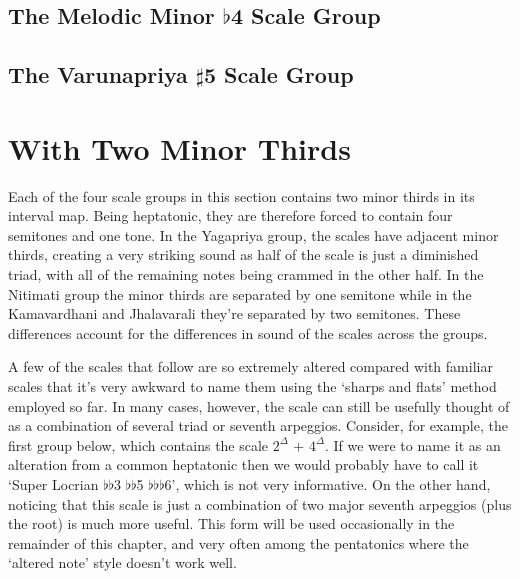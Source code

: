 \documentclass[english]{./gbook}
\begin{document}
\begin{large}
\subsection{The Melodic Minor $\flat$4 Scale Group}

\subsection{The Varunapriya $\sharp$5 Scale Group}


\section{With Two Minor Thirds}

Each of the four scale groups in this section contains two minor thirds in its interval map. Being heptatonic, they are therefore forced to contain four semitones and one tone. In the Yagapriya group, the scales have adjacent minor thirds, creating a very striking sound as half of the scale is just a diminished triad, with all of the remaining notes being crammed in the other half. In the Nitimati group the minor thirds are separated by one semitone while in the Kamavardhani and Jhalavarali they're separated by two semitones. These differences account for the differences in sound of the scales across the groups.

A few of the scales that follow are so extremely altered compared with familiar scales that it's very awkward to name them using the `sharps and flats' method employed so far. In many cases, however, the scale can still be usefully thought of as a combination of several triad or seventh arpeggios. Consider, for example, the first group below, which contains the scale $2^{\Delta}$ + $4^{\Delta}$. If we were to name it as an alteration from a common heptatonic then we would probably have to call it `Super Locrian $\flat\flat$3 $\flat\flat$5 $\flat\flat\flat$6', which is not very informative. On the other hand, noticing that this scale is just a combination of two major seventh arpeggios (plus the root) is much more useful. This form will be used occasionally in the remainder of this chapter, and very often among the pentatonics where the `altered note' style doesn't work well.


\end{large}
\end{document}
